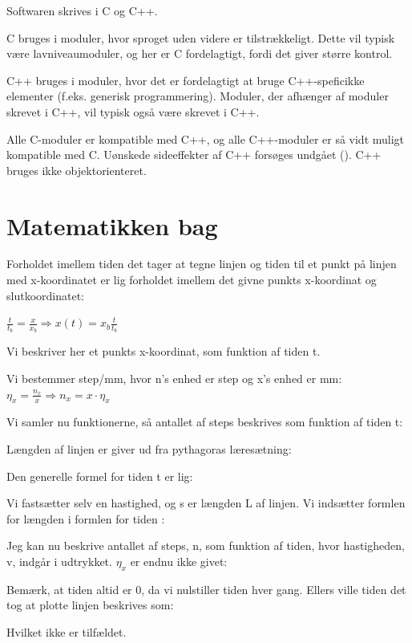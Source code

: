 Softwaren skrives i C og C++.

C bruges i moduler, hvor sproget uden videre er tilstrækkeligt. Dette
vil typisk være lavniveaumoduler, og her er C fordelagtigt, fordi det
giver større kontrol.

C++ bruges i moduler, hvor det er fordelagtigt at bruge C++-speficikke
elementer (f.eks. generisk programmering). Moduler, der afhænger af moduler skrevet i C++, vil typisk
også være skrevet i C++.

Alle C-moduler er kompatible med C++, og alle C++-moduler er så vidt
muligt kompatible med C. Uønskede sideeffekter af C++ forsøges undgået
(). C++ bruges ikke objektorienteret.

\section{Matematikken bag}

Forholdet imellem tiden det tager at tegne linjen og tiden til et punkt på linjen med x-koordinatet er lig forholdet imellem det givne punkts x-koordinat og slutkoordinatet:

$\frac{t}{t_b}=\frac{x}{x_b}\Rightarrow x(t)=x_b\frac{t}{t_b}$
 
Vi beskriver her et punkts x-koordinat, som funktion af tiden t.

Vi bestemmer step/mm, hvor n’s enhed er step og x’s enhed er mm:
$\eta_x=\frac{n_x}{x}\Rightarrow n_x=x\cdot\eta_x$

Vi samler nu funktionerne, så antallet af steps beskrives som funktion af tiden t:

Længden af linjen er giver ud fra pythagoras læresætning:

Den generelle formel for tiden t er lig:

Vi fastsætter selv en hastighed, og s er længden L af linjen. Vi indsætter formlen for længden i formlen for tiden :


Jeg kan nu beskrive antallet af steps, n, som funktion af tiden, hvor hastigheden, v, indgår i udtrykket. $\eta_x$ er endnu ikke givet:


Bemærk, at tiden   altid er 0, da vi nulstiller tiden hver gang. Ellers ville tiden det tog at plotte linjen beskrives som:
 
Hvilket ikke er tilfældet.


